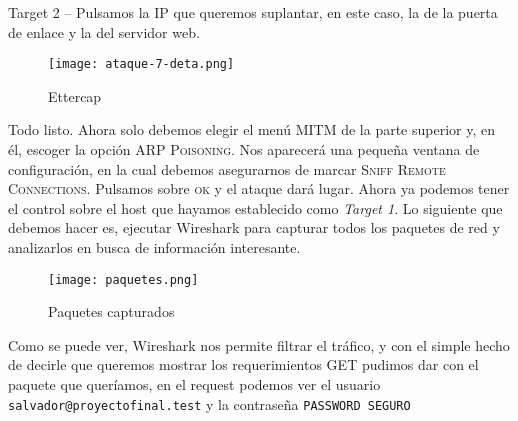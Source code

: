     Target 2 – Pulsamos la IP que queremos suplantar, en este caso, la de la 
    puerta de enlace y la del servidor web.

    \begin{center}
        \begin{figure}   
           \begin{center}
              \texttt{[image: ataque-7-deta.png]}
           \end{center}
           \caption{Ettercap}
        \end{figure}
     \end{center}

Todo listo. Ahora solo debemos elegir el menú \textsc{MITM} de la parte superior y, en él, 
escoger la opción \textsc{ARP Poisoning}. Nos aparecerá una pequeña ventana de configuración, 
en la cual debemos asegurarnos de marcar \textsc{Sniff Remote Connections}.
Pulsamos sobre \textsc{ok} y el ataque dará lugar. Ahora ya podemos tener el control 
sobre el host que hayamos establecido como \emph{Target 1}. Lo siguiente que debemos 
hacer es, ejecutar Wireshark para capturar todos los paquetes de 
red y analizarlos en busca de información interesante.

\begin{center}
   \begin{figure}   
      \begin{center}
         \texttt{[image: paquetes.png]}
      \end{center}
      \caption{Paquetes capturados}
   \end{figure}
\end{center}

Como se puede ver, Wireshark nos permite filtrar el tráfico, y con el 
simple hecho de decirle que queremos mostrar los requerimientos GET
pudimos dar con el paquete que queríamos, en el request podemos ver
el usuario \texttt{salvador@proyectofinal.test} y la contraseña \texttt{PASSWORD SEGURO}
